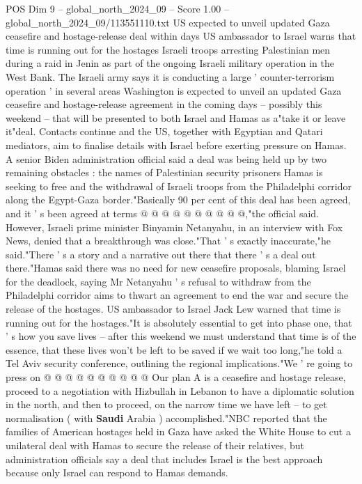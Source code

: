 \begin{textsample}{POS Dim 9 – global\_north\_2024\_09 – Score 1.00 – global\_north\_2024\_09/113551110.txt}  \label{ex:f9_pos_429}
US expected to unveil updated Gaza ceasefire and hostage-release deal within days US ambassador to Israel warns that time is running out for the hostages Israeli troops arresting Palestinian men during a raid in Jenin as part of the ongoing Israeli military operation in the West Bank.
The Israeli army says it is conducting a large ' counter-terrorism operation ' in several areas Washington is expected to unveil an updated Gaza ceasefire and hostage-release agreement in the coming days -- possibly this weekend -- that will be presented to both Israel and Hamas as a"take it or leave it"deal.
Contacts continue and the US, together with Egyptian and Qatari mediators, aim to finalise details with Israel before exerting pressure on Hamas.
A senior Biden administration official said a deal was being held up by two remaining obstacles : the names of Palestinian security prisoners Hamas is seeking to free and the withdrawal of Israeli troops from the Philadelphi corridor along the Egypt-Gaza border."Basically 90 per cent of this deal has been agreed, and it ' s been agreed at terms @ @ @ @ @ @ @ @ @ @,"the official said.
However, Israeli prime minister Binyamin Netanyahu, in an interview with Fox News, denied that a breakthrough was close."That ' s exactly inaccurate,"he said."There ' s a story and a narrative out there that there ' s a deal out there."Hamas said there was no need for new ceasefire proposals, blaming Israel for the deadlock, saying Mr Netanyahu ' s refusal to withdraw from the Philadelphi corridor aims to thwart an agreement to end the war and secure the release of the hostages.
US ambassador to Israel Jack Lew warned that time is running out for the hostages."It is absolutely essential to get into phase one, that ' s how you save lives -- after this weekend we must understand that time is of the essence, that these lives won't be left to be saved if we wait too long,"he told a Tel Aviv security conference, outlining the regional implications."We ' re going to press on @ @ @ @ @ @ @ @ @ @ Our plan A is a ceasefire and hostage release, proceed to a negotiation with Hizbullah in Lebanon to have a diplomatic solution in the north, and then to proceed, on the narrow time we have left -- to get normalisation ( with \textbf{Saudi} Arabia ) accomplished."NBC reported that the families of American hostages held in Gaza have asked the White House to cut a unilateral deal with Hamas to secure the release of their relatives, but administration officials say a deal that includes Israel is the best approach because only Israel can respond to Hamas demands.

\end{textsample}
